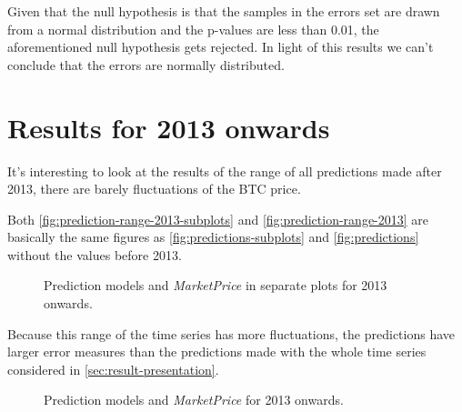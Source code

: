 Given that the null hypothesis is that the samples in the errors set
are drawn from a normal distribution and the p-values are less than
0.01, the aforementioned null hypothesis gets rejected. In light of
this results we can't conclude that the errors are normally
distributed.

\section{Results for 2013 onwards}
\label{sec:results-for-2013-onwards}

It's interesting to look at the results of the range of all
predictions made after 2013, there are barely fluctuations of the BTC
price.

Both \autoref{fig:prediction-range-2013-subplots} and
\autoref{fig:prediction-range-2013} are basically the same figures as
\autoref{fig:predictions-subplots} and \autoref{fig:predictions}
without the values before 2013.

\begin{figure}[bth]
  \caption{Prediction models and \textit{MarketPrice} in separate
    plots for 2013 onwards.}
  \label{fig:prediction-range-2013-subplots}
\end{figure}

Because this range of the time series has more fluctuations, the
predictions have larger error measures than the predictions made with
the whole time series considered in \autoref{sec:result-presentation}.

\begin{figure}[bth]
  \caption{Prediction models and \textit{MarketPrice} for 2013 onwards.}
  \label{fig:prediction-range-2013}
\end{figure}

